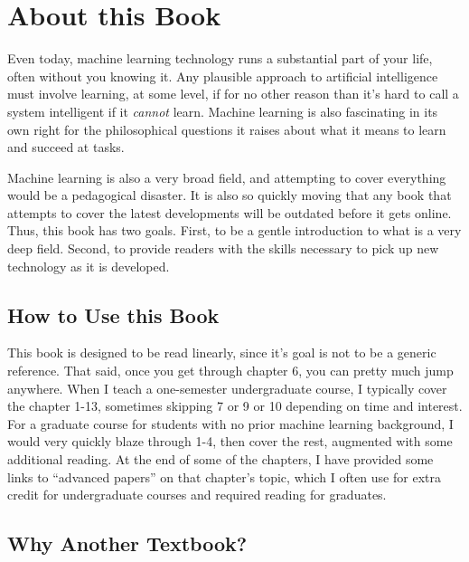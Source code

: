 
\chapter{About this Book} \label{sec:intro}

Even today, machine learning technology runs a substantial part of your life, often without you knowing it.
Any plausible approach to artificial intelligence must involve learning, at some level, if for no other reason than it's hard to call a system intelligent if it \emph{cannot} learn.
Machine learning is also fascinating in its own right for the philosophical questions it raises about what it means to learn and succeed at tasks.

Machine learning is also a very broad field, and attempting to cover everything would be a pedagogical disaster.
It is also so quickly moving that any book that attempts to cover the latest developments will be outdated before it gets online.
Thus, this book has two goals.
First, to be a gentle introduction to what is a very deep field.
Second, to provide readers with the skills necessary to pick up new technology as it is developed.

\section{How to Use this Book}

This book is designed to be read linearly, since it's goal is not to be a generic reference.
That said, once you get through chapter 6, you can pretty much jump anywhere.
When I teach a one-semester undergraduate course, I typically cover the chapter 1-13, sometimes skipping 7 or 9 or 10 depending on time and interest.
For a graduate course for students with no prior machine learning background, I would very quickly blaze through 1-4, then cover the rest, augmented with some additional reading.
At the end of some of the chapters, I have provided some links to ``advanced papers'' on that chapter's topic, which I often use for extra credit for undergraduate courses and required reading for graduates.


\section{Why Another Textbook?}

